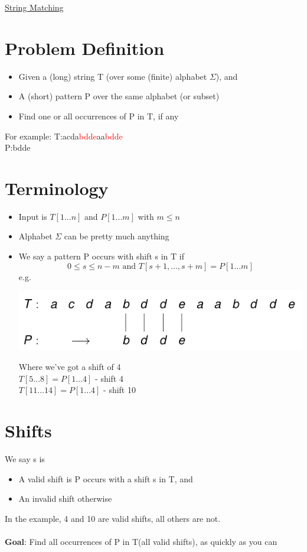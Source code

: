 \documentclass{article}[18pt]
\begin{document}
\begin{center}
\underline{\huge String Matching}
\end{center}
\section{Problem Definition}
\begin{itemize}
	\item Given a (long) string T (over some (finite) alphabet $\Sigma$), and
	\item A (short) pattern P over the same alphabet (or subset)
	\item Find one or all occurrences of P in T, if any
\end{itemize}
For example:
T:acda\textcolor{red}{bdde}aa\textcolor{red}{bdde}\\
P:bdde
\section{Terminology}
\begin{itemize}
	\item Input is $T[1...n]$ and $P[1...m]$ with $m\leqslant n$
	\item Alphabet $\Sigma$ can be pretty much anything
	\item We say a pattern P occurs with shift s in T if
	\[ 
	0 \leq s \leq n-m \text { and } T[s+1, \ldots, s+m]=P[1 \ldots m]
	\]
	e.g.
	\begin{center}
		\includegraphics[scale=0.7]{Terminology}
	\end{center}
	Where we've got a shift of 4\\
	$T[5...8]=P[1...4]$ - shift 4\\
	$T[11...14]=P[1...4]$ - shift 10
	
\end{itemize}
\section{Shifts}
We say s is
\begin{itemize}
	\item A valid shift is P occurs with a shift s in T, and
	\item An invalid shift otherwise
\end{itemize}
In the example, 4 and 10 are valid shifts, all others are not.\\
\\
\textbf{Goal}: Find all occurrences of P in T(all valid shifts), as quickly as you can
\end{document}

